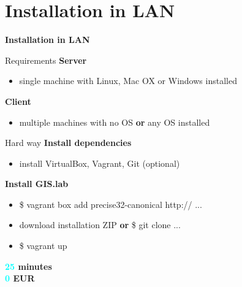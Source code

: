 \documentclass[12pt]{beamer}
\begin{document}
\section{Installation in LAN}
\begin{frame}
	\begin{center}
		\LARGE\textbf{Installation in LAN}	
	\end{center}
\end{frame}


\begin{frame}{Requirements}
	\textbf{Server}
	\begin{itemize}
		\item single machine with Linux, Mac OX or Windows installed
	\end{itemize}
	
	\textbf{Client}
	\begin{itemize}
		\item multiple machines with no OS \textbf{or} any OS installed
	\end{itemize}
\end{frame}


\begin{frame}{Hard way}
	\textbf{Install dependencies}
	\begin{itemize}
		\item install VirtualBox, Vagrant, Git (optional)
	\end{itemize}

	\textbf{Install GIS.lab}
	\begin{itemize}
		\item \$ vagrant box add precise32-canonical http:// ...
		\item download installation ZIP \textbf{or} \$ git clone ...
		\item \$ vagrant up
	\end{itemize}
	\begin{flushleft}
		\textbf{\textcolor{Cyan}{25} minutes} \\
		\textbf{\textcolor{Cyan}{0} EUR} \\
	\end{flushleft}
\end{frame}
\end{document}
